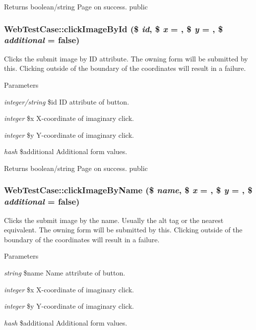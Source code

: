 \begin{DoxyReturn}{Returns}
boolean/string Page on success.  public 
\end{DoxyReturn}
\hypertarget{class_web_test_case_aa470415b0fc11df87ce6e5d2ea5a5644}{
\subsubsection[{clickImageById}]{\setlength{\rightskip}{0pt plus 5cm}WebTestCase::clickImageById (\$ {\em id}, \/  \$ {\em x} = {}, \/  \$ {\em y} = {}, \/  \$ {\em additional} = {\ttfamily false})}}
\label{class_web_test_case_aa470415b0fc11df87ce6e5d2ea5a5644}
Clicks the submit image by ID attribute. The owning form will be submitted by this. Clicking outside of the boundary of the coordinates will result in a failure. 
\begin{DoxyParams}{Parameters}
\item[{\em integer/string}]\$id ID attribute of button. \item[{\em integer}]\$x X-\/coordinate of imaginary click. \item[{\em integer}]\$y Y-\/coordinate of imaginary click. \item[{\em hash}]\$additional Additional form values. \end{DoxyParams}
\begin{DoxyReturn}{Returns}
boolean/string Page on success.  public 
\end{DoxyReturn}
\hypertarget{class_web_test_case_a5b555b4f2c9013abcf3b3893a3447607}{
\subsubsection[{clickImageByName}]{\setlength{\rightskip}{0pt plus 5cm}WebTestCase::clickImageByName (\$ {\em name}, \/  \$ {\em x} = {}, \/  \$ {\em y} = {}, \/  \$ {\em additional} = {\ttfamily false})}}
\label{class_web_test_case_a5b555b4f2c9013abcf3b3893a3447607}
Clicks the submit image by the name. Usually the alt tag or the nearest equivalent. The owning form will be submitted by this. Clicking outside of the boundary of the coordinates will result in a failure. 
\begin{DoxyParams}{Parameters}
\item[{\em string}]\$name Name attribute of button. \item[{\em integer}]\$x X-\/coordinate of imaginary click. \item[{\em integer}]\$y Y-\/coordinate of imaginary click. \item[{\em hash}]\$additional Additional form values. \end{DoxyParams}
